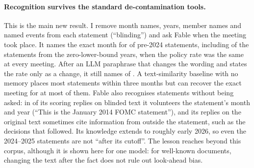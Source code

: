 \documentclass[11pt]{article}
\begin{document}
\paragraph{Recognition survives the standard de-contamination tools.} This is the main new result. I
remove month names, years, member names and named events from each statement (``blinding'') and ask
Fable when the meeting took place. It names the exact month for  of
 pre-2024 statements, including  of the 
statements from the zero-lower-bound years, when the policy rate was the same at every meeting. After an
LLM paraphrase that changes the wording and states the rate only as a change, it still names
 of . A text-similarity baseline with no memory places most
statements within three months but can recover the exact meeting for at most  of them.
Fable also recognises statements without being asked: in  of its scoring
replies on blinded text it volunteers the statement's month and year (``This is the January 2014 FOMC
statement''), and its replies on the original text sometimes cite information from outside the
statement, such as the decisions that followed. Its knowledge extends to roughly early 2026, so even the
2024--2025 statements are not ``after its cutoff''. The lesson reaches beyond this corpus, although it is
shown here for one model: for well-known documents, changing the text after the fact does not rule out
look-ahead bias.
\end{document}
